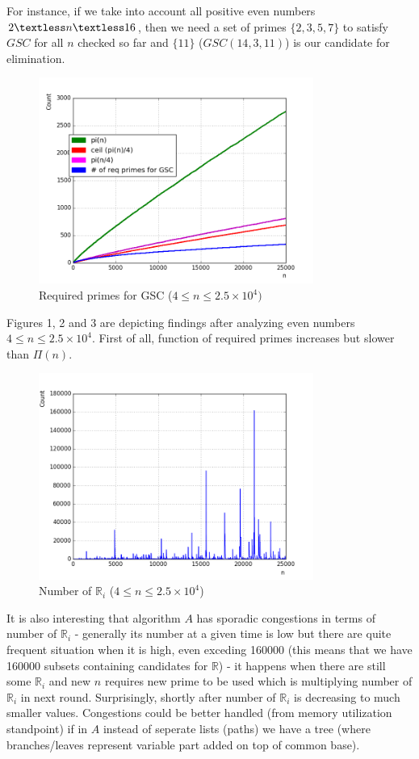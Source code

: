\documentclass[10pt,twocolumn]{article}
\begin{document}
For instance, if we take into account all positive even numbers $2 \textless n \textless 16$, then we need a set of primes $\{2,3,5,7\}$ to satisfy $GSC$ for all $n$ checked so far and $\{11\}$ ($GSC(14, 3, 11)$) is our candidate for elimination.	

\begin{figure}[!ht]
\centering
\captionsetup{justification=centering}
\includegraphics[width=9cm]{f_required_primes}
\caption[caption]{Required primes for GSC ($4 \leq n \leq 2.5 \times 10^4)$}
\label{fig:requiredprimes}
\end{figure}	

Figures 1, 2 and 3 are depicting findings after analyzing even numbers $4 \leq n \leq 2.5 \times 10^4$. First of all, function of required primes increases but slower than $\Pi(n)$.

\begin{figure}[!ht]
\centering
\captionsetup{justification=centering}
\includegraphics[width=9cm]{f_number_of_possible_sets}
\caption[caption]{Number of $\mathbb{R}_i$ ($4 \leq n \leq 2.5 \times 10^4$)}
\label{fig:numberofsets}
\end{figure}

It is also interesting that algorithm $A$ has sporadic congestions in terms of number of $\mathbb{R}_i$ - generally its number at a given time is low but there are quite frequent situation when it is high, even exceding 160000 (this means that we have 160000 subsets containing candidates for $\mathbb{R}$) - it happens when there are still some $\mathbb{R}_i$ and new $n$ requires new prime to be used which is multiplying number of $\mathbb{R}_i$ in next round. Surprisingly, shortly after number of $\mathbb{R}_i$ is decreasing to much smaller values. Congestions could be better handled (from memory utilization standpoint) if in $A$ instead of seperate lists (paths) we have a tree (where branches/leaves represent variable part added on top of common base).
\end{document}
